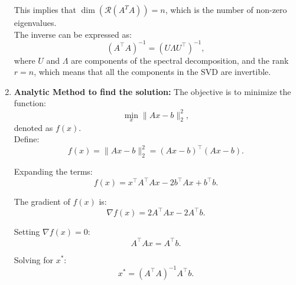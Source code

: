 \begin{derivation}
\begin{enumerate}
    This implies that $\dim (\mathcal{R} (A^T A)) = n$, which is the number of non-zero eigenvalues. \\

    The inverse can be expressed as:
    \[
    (A^\top A)^{-1} = (U \Lambda U^\top)^{-1},
    \]
    where $U$ and $\Lambda$ are components of the spectral decomposition, and the rank $r = n$, which means that all the components in the SVD are invertible.

    \item \textbf{Analytic Method to find the solution:}
    The objective is to minimize the function:
    \[
    \min_x \|A x - b\|_2^2,
    \]
    denoted as $f(x)$. \\
    
    Define:
    \[
    f(x) = \|A x - b\|_2^2 = (A x - b)^\top (A x - b).
    \]
    
    Expanding the terms:
    \[
    f(x) = x^\top A^\top A x - 2 b^\top A x + b^\top b.
    \]
    
    The gradient of $f(x)$ is:
    \[
    \nabla f(x) = 2 A^\top A x - 2 A^\top b.
    \]
    
    Setting $\nabla f(x) = 0$:
    \[
    A^\top A x = A^\top b.
    \]
    
    Solving for $x^*$:
    \[
    x^* = (A^\top A)^{-1} A^\top b.
    \]
    \end{enumerate} 

\end{derivation}

